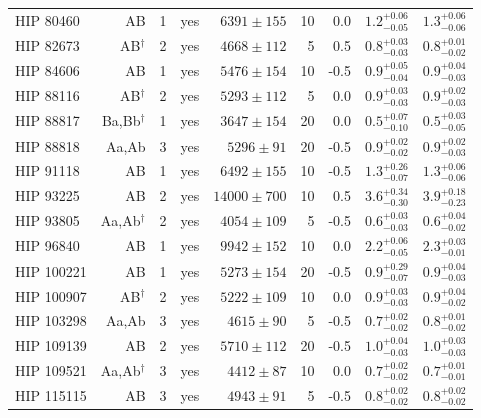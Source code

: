 {\begin{scriptsize}
\begin{longtable}{|l|rrlrrrll|}
  HIP 80460 & AB &     1 & yes &  $6391 \pm 155$ &      10 &     0.0  &  $1.2^{+0.06}_{-0.05}$ &  $1.3^{+0.06}_{-0.06}$ \\
  HIP 82673 & AB$^{\dagger}$ &     2 & yes &  $4668 \pm 112$ &       5 &     0.5  &  $0.8^{+0.03}_{-0.03}$ &  $0.8^{+0.01}_{-0.02}$ \\
  HIP 84606 & AB &     1 & yes &  $5476 \pm 154$ &      10 &    -0.5 &  $0.9^{+0.05}_{-0.04}$ &  $0.9^{+0.04}_{-0.03}$ \\
  HIP 88116 & AB$^{\dagger}$ &     2 & yes &  $5293 \pm 112$ &       5 &     0.0  &  $0.9^{+0.03}_{-0.03}$ &  $0.9^{+0.02}_{-0.03}$ \\
  HIP 88817 & Ba,Bb$^{\dagger}$ &     1 & yes &  $3647 \pm 154$ &      20 &     0.0  &  $0.5^{+0.07}_{-0.10}$ &  $0.5^{+0.03}_{-0.05}$ \\
  HIP 88818 & Aa,Ab &     3 & yes &   $5296 \pm 91$ &      20 &    -0.5 &  $0.9^{+0.02}_{-0.02}$ &  $0.9^{+0.02}_{-0.03}$ \\
  HIP 91118 & AB &     1 & yes &  $6492 \pm 155$ &      10 &    -0.5  &  $1.3^{+0.26}_{-0.07}$ &  $1.3^{+0.06}_{-0.06}$ \\
  HIP 93225 & AB &     2 & yes &   $14000 \pm 700$ &     10 &     0.5 &  $3.6^{+0.34}_{-0.30}$ &  $3.9^{+0.18}_{-0.23}$ \\
  HIP 93805 & Aa,Ab$^{\dagger}$ &     2 & yes &  $4054 \pm 109$ &       5 &    -0.5  &  $0.6^{+0.03}_{-0.03}$ &  $0.6^{+0.04}_{-0.02}$ \\
  HIP 96840 & AB &     1 & yes &  $9942 \pm 152$ &      10 &     0.0  &    $2.2^{+0.06}_{-0.05}$ &  $2.3^{+0.03}_{-0.01}$ \\
 HIP 100221 & AB &     1 & yes &  $5273 \pm 154$ &      20 &    -0.5  &  $0.9^{+0.29}_{-0.07}$ &  $0.9^{+0.04}_{-0.03}$ \\
 HIP 100907 & AB$^{\dagger}$ &     2 & yes &  $5222 \pm 109$ &      10 &     0.0  &  $0.9^{+0.03}_{-0.03}$ &  $0.9^{+0.04}_{-0.02}$ \\
 HIP 103298 & Aa,Ab &     3 & yes &   $4615 \pm 90$ &       5 &    -0.5  &  $0.7^{+0.02}_{-0.02}$ &  $0.8^{+0.01}_{-0.02}$ \\
 HIP 109139 & AB &     2 & yes &  $5710 \pm 112$ &      20 &    -0.5  &  $1.0^{+0.04}_{-0.03}$ &  $1.0^{+0.03}_{-0.03}$ \\
 HIP 109521 & Aa,Ab$^{\dagger}$ &     3 & yes &   $4412 \pm 87$ &      10 &     0.0  &  $0.7^{+0.02}_{-0.02}$ &  $0.7^{+0.01}_{-0.01}$ \\
 HIP 115115 & AB &     3 & yes &   $4943 \pm 91$ &       5 &    -0.5  &  $0.8^{+0.02}_{-0.02}$ &  $0.8^{+0.02}_{-0.02}$ 
 
\end{longtable}
\end{scriptsize}
}

